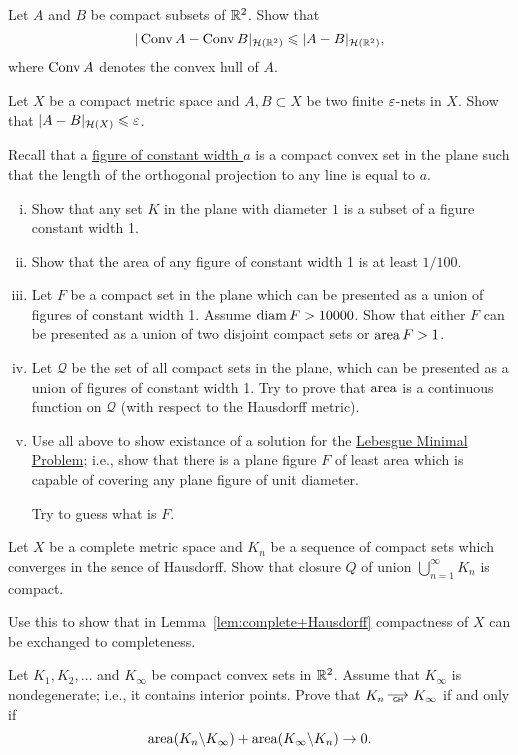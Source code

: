 \begin{pr}\label{pr:Hausdorff-Conv}
Let $A$ and $B$ be compact subsets of $\mathbb{R}^2$.
Show that 
$$ |\operatorname{Conv} A-\operatorname{Conv} B|_{\mathcal{H}(\mathbb{R}^2)}\leqslant |A- B|_{\mathcal{H}(\mathbb{R}^2)},$$
where $\operatorname{Conv} A$ denotes the convex hull of $A$.
\end{pr}



\begin{pr}
Let $X$ be a compact metric space and $A, B\subset X$ be two finite $\varepsilon$-nets in $X$.
Show that $|A-B|_{\mathcal{H}(X)}\leqslant \varepsilon$.
\end{pr}


\begin{pr}\label{pr:LebesgueMinimalProblem}
Recall that a \href{http://en.wikipedia.org/wiki/Curve_of_constant_width}{figure of constant width $a$} is a compact convex set in the plane such that the length of the orthogonal projection to any line is equal to $a$. 
\begin{enumerate}[(i)]
\item Show that any set $K$ in the plane with diameter $1$ is a subset of a figure  constant width 1.
\item Show that the area of any figure of constant width 1 is at least $1/100$.
\item Let $F$ be a compact set in the plane which can be presented as a union of figures of constant width 1.
Assume $\operatorname{diam} F>10000$.
Show that either $F$ can be presented as a union of two disjoint compact sets or $\operatorname{area} F>1$.
\item Let $\mathcal{Q}$ be the set of all compact sets in the plane, which can be presented as a union of figures of constant width 1.
Try to prove that $\operatorname{area}$ is a continuous function on $\mathcal{Q}$ (with respect to the Hausdorff metric).
\item Use all above to show existance of a solution for the \href{http://mathworld.wolfram.com/LebesgueMinimalProblem.html}{Lebesgue Minimal Problem};
i.e., show that there is a plane figure $F$ of least area  which is capable of covering any plane figure of unit  diameter.

Try to guess what is $F$.
\end{enumerate}
\end{pr}

\begin{pr}\label{pr:complete>compact}
Let $X$ be a complete metric space and $K_n$ be a sequence of compact sets 
which converges in the sence of Hausdorff.
Show that closure $Q$ of union $\bigcup_{n=1}^\infty K_n$ is compact.

Use this to show that in Lemma~\ref{lem:complete+Hausdorff} compactness of $X$ can be exchanged to completeness.
\end{pr}

\begin{pr}\label{pr:GH/area}
Let $K_1, K_2, \dots$ and $K_\infty$ be compact convex sets in $\mathbb{R}^2$.
Assume that $K_\infty$ is nondegenerate;
i.e., it contains interior points.
Prove that $K_n\GHto K_\infty$ if and only if 
$$\operatorname{area} (K_n\backslash K_\infty)+\operatorname{area} (K_\infty\backslash K_n)\to 0.$$
\end{pr}






